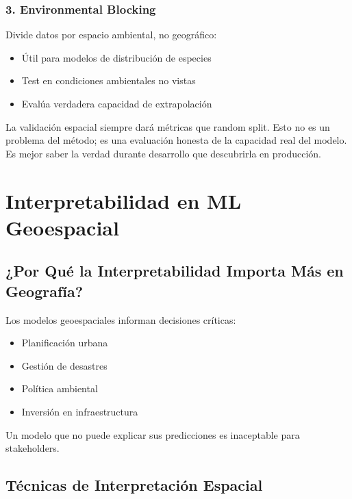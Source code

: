 \documentclass[12pt,a4paper]{article}
\begin{document}
\subsubsection{3. Environmental Blocking}

Divide datos por espacio ambiental, no geográfico:
\begin{itemize}
    \item Útil para modelos de distribución de especies
    \item Test en condiciones ambientales no vistas
    \item Evalúa verdadera capacidad de extrapolación
\end{itemize}

\begin{reflexion}
La validación espacial siempre dará métricas  que random split. Esto no es un problema del método; es una evaluación honesta de la capacidad real del modelo. Es mejor saber la verdad durante desarrollo que descubrirla en producción.
\end{reflexion}

\section{Interpretabilidad en ML Geoespacial}

\subsection{¿Por Qué la Interpretabilidad Importa Más en Geografía?}

Los modelos geoespaciales informan decisiones críticas:
\begin{itemize}
    \item Planificación urbana
    \item Gestión de desastres
    \item Política ambiental
    \item Inversión en infraestructura
\end{itemize}

Un modelo  que no puede explicar sus predicciones es inaceptable para stakeholders.

\subsection{Técnicas de Interpretación Espacial}
\end{document}
